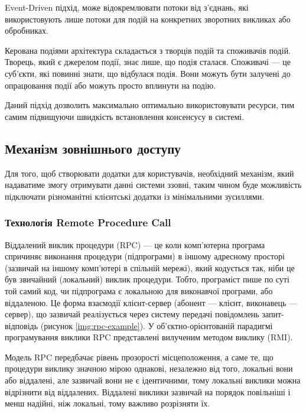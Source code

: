 \documentclass{lib/styles/default-style}
\begin{document}
    Event-Driven підхід, може відокремлювати потоки від з'єднань,
    які використовують лише потоки для подій на конкретних зворотних викликах або обробниках.

    Керована подіями архітектура складається з творців подій та споживачів подій.
    Творець, який є джерелом події, знає лише, що подія сталася.
    Споживачі --- це суб'єкти, які повинні знати, що відбулася подія.
    Вони можуть бути залучені до опрацювання події або можуть просто вплинути на подію.

    Даний підхід дозволить максимально оптимально використовувати ресурси, тим самим підвищуючи швидкість встановлення консенсусу в системі.

\subsection{Механізм зовнішнього доступу}

    Для того, щоб створювати додатки для користувачів, необхідний механізм, який надаватиме змогу отримувати данні системи ззовні,
    таким чином буде можливість підключати різноманітні клієнтські додатки із мінімальними зусиллями.

    \subsubsection{Технологія Remote Procedure Call}

    Віддалений виклик процедури (RPC) --- це коли комп'ютерна програма спричиняє виконання процедури (підпрограми) в
    іншому адресному просторі (зазвичай на іншому комп’ютері в спільній мережі),
    який кодується так, ніби це був звичайний (локальний) виклик процедури.
    Тобто, програміст пише по суті той самий код, чи підпрограма є локальною для виконавчої програми, або віддаленою.
    Це форма взаємодії клієнт-сервер (абонент --- клієнт, виконавець --- сервер), що зазвичай реалізується через систему передачі
    повідомлень запит-відповідь (рисунок \ref{img:rpc-example}). У об'єктно-орієнтованій парадигмі програмування виклики RPC
    представлені вилученим методом виклику (RMI).


    Модель RPC передбачає рівень прозорості місцеположення, а саме те,
    що процедури виклику значною мірою однакові, незалежно від того,
    локальні вони або віддалені, але зазвичай вони не є ідентичними,
    тому локальні виклики можна відрізнити від віддалених.
    Віддалені виклики зазвичай на порядок повільніші і менш надійні, ніж локальні, тому важливо розрізняти їх.
\end{document}
